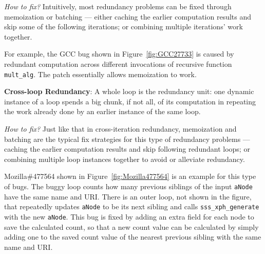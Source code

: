{\textit{How to fix?}}
Intuitively, most redundancy problems can be fixed through memoization or
batching --- either caching the earlier computation results and skip
some of the following iterations; or combining multiple iterations' work
together.

For example, the GCC bug shown in Figure~\ref{fig:GCC27733} is caused by
redundant computation across different invocations of recursive function
\texttt{mult\_alg}. The patch essentially allows memoization to work.

{\textbf{Cross-loop Redundancy}}:
A whole loop is the redundancy unit:
one dynamic instance of a loop spends a big chunk, if not all, of its
computation in repeating the work already done by an
earlier instance of the same loop.

{\textit{How to fix?}}
Just like that in cross-iteration redundancy, memoization and batching
are the typical fix strategies for this type of redundancy problems ---
caching the earlier computation results and skip following redundant loops;
or combining multiple loop instances together to avoid or alleviate redundancy.

Mozilla\#477564 shown in Figure~\ref{fig:Mozilla477564} is an example for this type of bugs. 
The buggy loop counts how many previous siblings of the input \texttt{aNode} have the same name and URI. 
There is an outer loop, not shown in the figure, that repeatedly updates
\texttt{aNode} to be its next sibling and calls
\texttt{sss\_xph\_generate} with the new \texttt{aNode}. 
This bug is fixed by adding an extra field for each node to save the calculated 
count, so that a new count value can be calculated by simply adding one to the
saved count value of the nearest previous sibling with the same name and URI.


